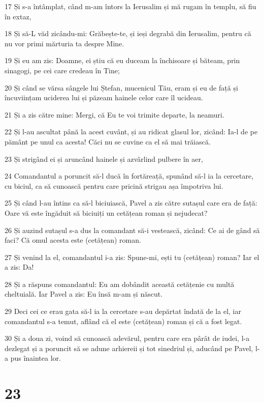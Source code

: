 \par 17 Și s-a întâmplat, când m-am întors la Ierusalim și mă rugam în templu, să fiu în extaz,
\par 18 Și să-L văd zicându-mi: Grăbește-te, și ieși degrabă din Ierusalim, pentru că nu vor primi mărturia ta despre Mine.
\par 19 Și eu am zis: Doamne, ei știu că eu duceam la închisoare și băteam, prin sinagogi, pe cei care credeau în Tine;
\par 20 Și când se vărsa sângele lui Ștefan, mucenicul Tău, eram și eu de față și încuviințam uciderea lui și păzeam hainele celor care îl ucideau.
\par 21 Și a zis către mine: Mergi, că Eu te voi trimite departe, la neamuri.
\par 22 Și l-au ascultat până la acest cuvânt, și au ridicat glasul lor, zicând: Ia-l de pe pământ pe unul ca acesta! Căci nu se cuvine ca el să mai trăiască.
\par 23 Și strigând ei și aruncând hainele și azvârlind pulbere în aer,
\par 24 Comandantul a poruncit să-l ducă în fortăreață, spunând să-l ia la cercetare, cu biciul, ca să cunoască pentru care pricină strigau așa împotriva lui.
\par 25 Și când l-au întins ca să-l biciuiască, Pavel a zis către sutașul care era de față: Oare vă este îngăduit să biciuiți un cetățean roman și nejudecat?
\par 26 Și auzind sutașul s-a dus la comandant să-i vestească, zicând: Ce ai de gând să faci? Că omul acesta este (cetățean) roman.
\par 27 Și venind la el, comandantul i-a zis: Spune-mi, ești tu (cetățean) roman? Iar el a zis: Da!
\par 28 Și a răspuns comandantul: Eu am dobândit această cetățenie cu multă cheltuială. Iar Pavel a zis: Eu însă m-am și născut.
\par 29 Deci cei ce erau gata să-l ia la cercetare s-au depărtat îndată de la el, iar comandantul s-a temut, aflând că el este (cetățean) roman și că a fost legat.
\par 30 Și a doua zi, voind să cunoască adevărul, pentru care era pârât de iudei, l-a dezlegat și a poruncit să se adune arhiereii și tot sinedriul și, aducând pe Pavel, l-a pus înaintea lor.

\chapter{23}

